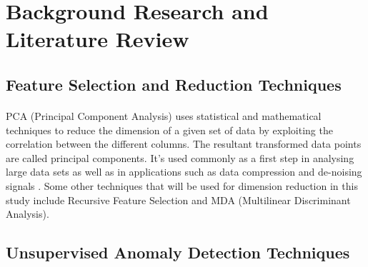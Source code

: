 \documentclass[12pt, twoside]{report}
\begin{document}
	
	\section{Background Research and Literature Review}
	\subsection{Feature Selection and Reduction Techniques}
	\paragraph{ }PCA (Principal Component Analysis) uses statistical and mathematical techniques to reduce the dimension of a given set of data by exploiting the correlation between the different columns. The resultant transformed data points are called principal components. It's used commonly as a first step in analysing large data sets as well as in applications such as data compression and de-noising signals \cite{r:PCA}. Some other techniques that will be used for dimension reduction in this study include Recursive Feature Selection and MDA (Multilinear Discriminant Analysis). 
	
	\subsection{Unsupervised Anomaly Detection Techniques}
\end{document}
